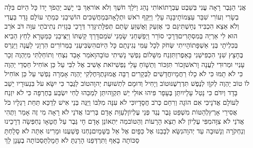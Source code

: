 \documentclass[../main/main.tex]{subfiles}
\begin{document}
\begin{multicols*}{\ncols}
אֲנִי הַגֶּבֶר רָאָה עֳנִי בְּשֵׁבֶט עֶבְרָתוֹ\PreVerseSpace{}אוֹתִי נָהַג וַיֹּלַךְ חֹשֶׁךְ וְלֹא אוֹר\PreVerseSpace{}אַךְ בִּי יָשֻׁב יַהֲפֹךְ יָדוֹ כָּל הַיּוֹם \ClosedSection{}בִּלָּה בְשָׂרִי וְעוֹרִי שִׁבַּר עַצְמוֹתָי\PreVerseSpace{}בָּנָה עָלַי וַיַּקַּף רֹאשׁ וּתְלָאָה\PreVerseSpace{}בְּמַחֲשַׁכִּים הוֹשִׁיבַנִי כְּמֵתֵי עוֹלָם \ClosedSection{}גָּדַר בַּעֲדִי וְלֹא אֵצֵא הִכְבִּיד נְחָשְׁתִּי\PreVerseSpace{}גַּם כִּי אֶזְעַק וַאֲשַׁוֵּעַ שָׂתַם תְּפִלָּתִי\PreVerseSpace{}גָּדַר דְּרָכַי בְּגָזִית נְתִיבֹתַי עִוָּה \ClosedSection{}דֹּב אֹרֵב הוּא לִי אַרְיֵה בְּמִסְתָּרִים\PreVerseSpace{}דְּרָכַי סוֹרֵר וַיְפַשְּׁחֵנִי שָׂמַנִי שֹׁמֵם\PreVerseSpace{}דָּרַךְ קַשְׁתּוֹ וַיַּצִּיבֵנִי כַּמַּטָּרָא לַחֵץ \ClosedSection{}הֵבִיא בְּכִלְיֹתָי בְּנֵי אַשְׁפָּתוֹ\PreVerseSpace{}הָיִיתִי שְּׂחֹק לְכָל עַמִּי נְגִינָתָם כָּל הַיּוֹם\PreVerseSpace{}הִשְׂבִּיעַנִי בַמְּרוֹרִים הִרְוַנִי לַעֲנָה \ClosedSection{}וַיַּגְרֵס בֶּחָצָץ שִׁנָּי הִכְפִּישַׁנִי בָּאֵפֶר\PreVerseSpace{}וַתִּזְנַח מִשָּׁלוֹם נַפְשִׁי נָשִׁיתִי טוֹבָה\PreVerseSpace{}וָאֹמַר אָבַד נִצְחִי וְתוֹחַלְתִּי מִיַּהְוֶה \ClosedSection{}זְכָר עָנְיִי וּמְרוּדִי לַעֲנָה וָרֹאשׁ\PreVerseSpace{}זָכוֹר תִּזְכּוֹר וְתַשָׁוֹחַ\SubEnd{} עָלַי נַפְשִׁי\PreVerseSpace{}זֹאת אָשִׁיב אֶל לִבִּי עַל כֵּן אוֹחִיל \ClosedSection{}חַסְדֵי יַהְוֶה כִּי לֹא תָמּוּ\SubEnd{} כִּי לֹא כָלוּ רַחֲמָיו\PreVerseSpace{}חֲדָשִׁים לַבְּקָרִים רַבָּה אֱמוּנָתֶךָ\PreVerseSpace{}חֶלְקִי יַהְוֶה אָמְרָה נַפְשִׁי עַל כֵּן אוֹחִיל לוֹ \ClosedSection{}טוֹב יַהְוֶה לְקוָֹו לְנֶפֶשׁ תִּדְרְשֶׁנּוּ\PreVerseSpace{}טוֹב וְיָחִיל וְדוּמָם לִתְשׁוּעַת יְהוָה\PreVerseSpace{}טוֹב לַגֶּבֶר כִּי יִשָּׂא עֹל בִּנְעוּרָיו \ClosedSection{}יֵשֵׁב בָּדָד וְיִדֹּם כִּי נָטַל עָלָיו\PreVerseSpace{}יִתֵּן בֶּעָפָר פִּיהוּ אוּלַי יֵשׁ תִּקְוָה\PreVerseSpace{}יִתֵּן לְמַכֵּהוּ לֶחִי יִשְׂבַּע בְּחֶרְפָּה \ClosedSection{}כִּי לֹא יִזְנַח לְעוֹלָם אֲדֹנָי\PreVerseSpace{}כִּי אִם הוֹגָה וְרִחַם כְּרֹב חֲסָדָיו\PreVerseSpace{}כִּי לֹא עִנָּה מִלִּבּוֹ וַיַּגֶּה בְּנֵי אִישׁ \ClosedSection{}לְדַכֵּא תַּחַת רַגְלָיו כֹּל אֲסִירֵי אָרֶץ\PreVerseSpace{}לְהַטּוֹת מִשְׁפַּט גָּבֶר נֶגֶד פְּנֵי עֶלְיוֹן\PreVerseSpace{}לְעַוֵּת אָדָם בְּרִיבוֹ אֲדֹנַי לֹא רָאָה \ClosedSection{}מִי זֶה אָמַר וַתֶּהִי אֲדֹנַי לֹא צִוָּה\PreVerseSpace{}מִפִּי עֶלְיוֹן לֹא תֵצֵא הָרָעוֹת וְהַטּוֹב\PreVerseSpace{}מַה יִּתְאוֹנֵן אָדָם חָי גֶּבֶר עַל חֲטָאָו \ClosedSection{}נַחְפְּשָׂה דְרָכֵינוּ וְנַחְקֹרָה וְנָשׁוּבָה עַד יְהוָה\PreVerseSpace{}נִשָּׂא לְבָבֵנוּ אֶל כַּפָּיִם אֶל אֵל בַּשָּׁמָיִם\PreVerseSpace{}נַחְנוּ פָשַׁעְנוּ וּמָרִינוּ אַתָּה לֹא סָלָחְתָּ \ClosedSection{}סַכּוֹתָה בָאַף וַתִּרְדְּפֵנוּ הָרַגְתָּ לֹא חָמָלְתָּ\PreVerseSpace{}סַכּוֹתָה בֶעָנָן לָךְ 
\end{multicols*}
\end{document}
